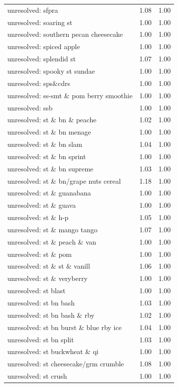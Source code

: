 \begin{table}
\begin{tabular}{lrr}
unresolved: sfpra & 1.08 & 1.00 \\
unresolved: soaring st & 1.00 & 1.00 \\
unresolved: southern pecan cheesecake & 1.00 & 1.00 \\
unresolved: spiced apple & 1.00 & 1.00 \\
unresolved: splendid st & 1.07 & 1.00 \\
unresolved: spooky st sundae & 1.00 & 1.00 \\
unresolved: sps\&cdrs & 1.00 & 1.00 \\
unresolved: ss-smt \& pom berry smoothie & 1.00 & 1.00 \\
unresolved: ssb & 1.00 & 1.00 \\
unresolved: st \& bn \& peache & 1.02 & 1.00 \\
unresolved: st \& bn menage & 1.00 & 1.00 \\
unresolved: st \& bn slam & 1.04 & 1.00 \\
unresolved: st \& bn sprint & 1.00 & 1.00 \\
unresolved: st \& bn supreme & 1.03 & 1.00 \\
unresolved: st \& bn/grape nuts cereal & 1.18 & 1.00 \\
unresolved: st \& guanabana & 1.00 & 1.00 \\
unresolved: st \& guava & 1.00 & 1.00 \\
unresolved: st \& h-p & 1.05 & 1.00 \\
unresolved: st \& mango tango & 1.07 & 1.00 \\
unresolved: st \& peach \& van & 1.00 & 1.00 \\
unresolved: st \& pom & 1.00 & 1.00 \\
unresolved: st \& st \& vanill & 1.06 & 1.00 \\
unresolved: st \& veryberry & 1.00 & 1.00 \\
unresolved: st blast & 1.00 & 1.00 \\
unresolved: st bn bash & 1.03 & 1.00 \\
unresolved: st bn bash \& rby & 1.02 & 1.00 \\
unresolved: st bn burst \& blue rby ice & 1.04 & 1.00 \\
unresolved: st bn split & 1.03 & 1.00 \\
unresolved: st buckwheat \& qi & 1.00 & 1.00 \\
unresolved: st cheesecake/grm crumble & 1.08 & 1.00 \\
unresolved: st crush & 1.00 & 1.00 \\

\end{tabular}
\end{table}
